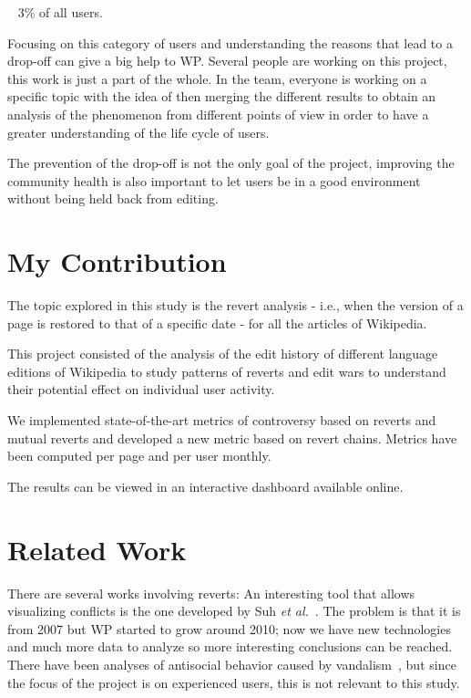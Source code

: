 ~ 3\% of all users. 

Focusing on this category of users and understanding the reasons that lead to a drop-off can give a
big help to WP. Several people are working on this project, this work is just a part of the whole.
In the team, everyone is working on a specific topic with the idea of then merging the different
results to obtain an analysis of the phenomenon from different points of view in order to have a
greater understanding of the life cycle of users.  

The prevention of the drop-off is not the only goal of the project, improving the community health
is also important to let users be in a good environment without being held back from editing. 

\section{My Contribution}
\label{sec:project}
The topic explored in this study is the revert analysis - i.e., when the version of a page is
restored to that of a specific date - for all the articles of Wikipedia.

This project consisted of the analysis of the edit history of different language editions of
Wikipedia to study patterns of reverts and edit wars to understand their potential effect on
individual user activity.

We implemented state-of-the-art metrics of controversy based on reverts and mutual reverts and
developed a new metric based on revert chains. Metrics have been computed per page and per user
monthly.

The results can be viewed in an interactive dashboard available online.

\section{Related Work}
There are several works involving reverts: An interesting tool that allows visualizing conflicts is
the one developed by Suh  \textit{et al.}~\cite{Suh2007}. The problem is that it is from 2007 but WP started to grow around
2010; now we have new technologies and much more data to analyze so more interesting conclusions can
be reached. There have been analyses of antisocial behavior caused by vandalism~\cite{Kiesel2017}, but since the focus
of the project is on experienced users, this is not relevant to this study. 
